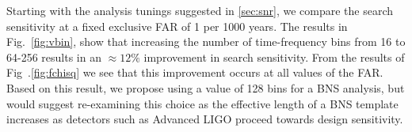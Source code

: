 Starting with the analysis tunings suggested in \ref{sec:snr}, we compare the search sensitivity at a fixed exclusive FAR of 1 per 1000 years. The results in Fig.~\ref{fig:vbin}, show that increasing the number of time-frequency bins from 16 to 64-256 results in an $\approx 12\%$ improvement in search sensitivity. From the results of Fig~.\ref{fig:fchisq} we see  that this improvement occurs at all values of the FAR. Based on this result, we propose using a value of 128 bins for a BNS analysis, but would suggest re-examining this choice as the effective length of a BNS template increases as detectors such as Advanced LIGO proceed towards design sensitivity.






